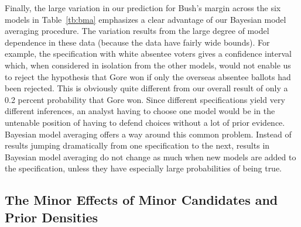 \documentclass[11pt,titlepage]{article}
\begin{document}
Finally, the large variation in our prediction for Bush's margin
across the six models in Table~\ref{tb:bma} emphasizes a clear
advantage of our Bayesian model averaging procedure.  The variation
results from the large degree of model dependence in these data
(because the data have fairly wide bounds).  For example, the
specification with white absentee voters gives a confidence interval
which, when considered in isolation from the other models, would not
enable us to reject the hypothesis that Gore won if only the overseas
absentee ballots had been rejected.  This is obviously quite different
from our overall result of only a 0.2 percent probability that Gore
won.  Since different specifications yield very different inferences,
an analyst having to choose one model would be in the untenable
position of having to defend choices without a lot of prior evidence.
Bayesian model averaging offers a way around this common problem.
Instead of results jumping dramatically from one specification to the
next, results in Bayesian model averaging do not change as much when
new models are added to the specification, unless they have especially
large probabilities of being true.

\subsection{The Minor Effects of Minor Candidates and Prior Densities}
\end{document}
